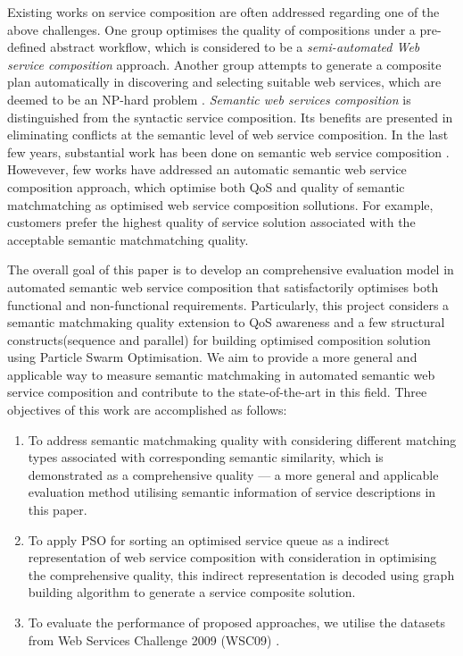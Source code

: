 \documentclass{llncs}
\begin{document}
Existing works on service composition are often addressed regarding one of the above challenges. One group optimises the quality of compositions under a pre-defined abstract workflow, which is considered to be a \textit{semi-automated Web service composition} approach. Another group attempts to generate a composite plan automatically in discovering and selecting suitable web services, which are deemed to be an NP-hard problem \cite{moghaddam2014service}. \textit{Semantic web services composition} is distinguished from the syntactic service composition. Its benefits are presented in eliminating conflicts at the semantic level of web service composition. In the last few years, substantial work has been done on semantic web service composition \cite{fensel2011semantic,lecue2009optimizing}. Howevever, few works have addressed an automatic semantic web service composition approach, which optimise both QoS and quality of semantic matchmatching as optimised web service composition sollutions. For example, customers prefer the highest quality of service solution associated with the acceptable semantic matchmatching quality.

The overall goal of this paper is to develop an comprehensive evaluation model in  automated semantic web service composition that satisfactorily optimises both functional and non-functional requirements. Particularly, this project considers a semantic matchmaking quality extension to QoS awareness and a few structural constructs(sequence and parallel) for building optimised composition solution using Particle Swarm Optimisation. We aim to provide a more general and applicable way to measure semantic matchmaking in automated semantic web service composition and contribute to the state-of-the-art in this field. Three objectives of this work are accomplished as follows:

\begin{enumerate}
 \item To address semantic matchmaking quality with considering different matching types associated with corresponding semantic similarity, which is demonstrated as a comprehensive quality --- a more general and applicable evaluation method utilising semantic information of service descriptions in this paper.
 
 \item To apply PSO for sorting an optimised service queue as a indirect representation of web service composition with consideration in optimising the comprehensive quality, this indirect representation is decoded using graph building algorithm to generate a service composite solution.
  
 \item To evaluate the performance of proposed approaches, we utilise the datasets from Web Services Challenge 2009 (WSC09) \cite{kona2009wsc}.
\end{enumerate}
\end{document}
